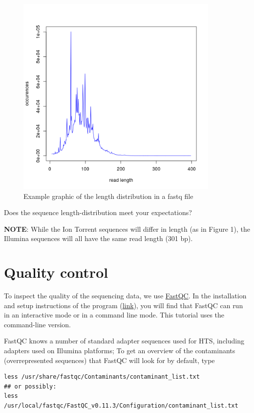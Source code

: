 \documentclass[11pt]{article}
\begin{document}
\begin{figure}[htb]
\centering
\includegraphics[width=10cm]{SequenceLengthDistribution.png}
\caption{Example graphic of the length distribution in a fastq file}
\end{figure}

Does the sequence length-distribution meet your expectations? 

\textbf{NOTE}: While the Ion Torrent sequences will differ in length (as in
Figure 1), the Illumina sequences will all have the same read length
(301 bp). 


\section{Quality control}
\label{sec:orgheadline2}
To inspect the quality of the sequencing data, we use
\href{http://www.bioinformatics.babraham.ac.uk/projects/fastqc/}{FastQC}. In
the installation and setup instructions of the program
(\href{http://www.bioinformatics.babraham.ac.uk/projects/fastqc/INSTALL.txt}{link}),
you will find that FastQC can run in an interactive mode or in a
command line mode. This tutorial uses the command-line version.

FastQC knows a number of standard adapter sequences used for HTS,
including adapters used on Illumina platforms; To get an overview of
the contaminants (overrepresented sequences) that FastQC will look
for by default, type

\begin{verbatim}
less /usr/share/fastqc/Contaminants/contaminant_list.txt
## or possibly:
less /usr/local/fastqc/FastQC_v0.11.3/Configuration/contaminant_list.txt
\end{verbatim}
\end{document}
